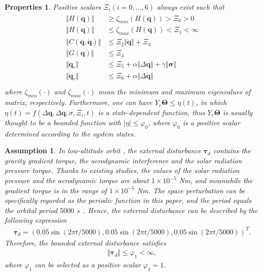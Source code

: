 \documentclass[3p]{elsarticle}
\theoremstyle{plain}
\newtheorem{myas}{Assumption}
\newtheorem{mypro}{Properties}
\theoremstyle{remark}
\begin{document}
\begin{mypro}\cite{parra2003dynamic}\label{pro:1}
Positive scalars $\Xi_i(i = 0,\ldots,6)$ always exist such that
\begin{align}
\begin{split}
\Vert H(\bm q)\Vert & \ge \zeta_{min}(H(\bm q))>\Xi_0>0\\
\Vert H(\bm q)\Vert & \le \zeta_{max}(H(\bm q))<\Xi_1<\infty\\
\Vert C(\bm q,\dot {\bm q})\Vert & \le \Xi_2\Vert\dot {\bm q}\Vert+\Xi_3\\
\Vert G(\bm q)\Vert & \le \Xi_4\\
\Vert \dot {\bm q}_r\Vert & \le \Xi_5+\alpha\Vert\Delta \bm q\Vert+\gamma\Vert\bm\sigma\Vert\\
\Vert \ddot {\bm q}_r\Vert & \le \Xi_6+\alpha\Vert\Delta \dot {\bm q}\Vert\\
\end{split}
\end{align}
where $\zeta_{min}(\cdot)$ and $\zeta_{max}(\cdot)$ mean the minimum and maximum eigenvalues of matrix, respectively. Furthermore, one can have $Y_r\bm\Theta\le \eta(t)$, in which $\eta(t)=f(\Delta \bm q,\Delta \dot {\bm q},\sigma,\Xi_i,t)$ is a state-dependent function, thus $Y_r\bm\Theta$ is usually thought to be a bounded function with $\vert\eta\vert\le\varphi_0$, where $\varphi_0$ is a positive scalar determined according to the system states.
\end{mypro}

\begin{myas}
In low-altitude orbit , the external disturbance $\bm\tau_d$ contains the gravity gradient torque, the aerodynamic interference and the solar radiation pressure torque. Thanks to existing studies, the values of the solar radiation pressure and the aerodynamic torque are about $1\times10^{-5}$ Nm, and meanwhile the gradient torque is in the range of $1\times10^{-5}$ Nm. The space perturbation can be specifically regarded as the periodic function in this paper, and the period equals the orbital period $5000$ s~\cite{Inamori2015192}. Hence, the external disturbance can be described by the following expression
\begin{align}
\bm\tau_d=\left(0.05\sin(2\pi t/5000),0.05\sin(2\pi t/5000),0.05\sin(2\pi t/5000)\right)^T.
\end{align}
Therefore, the bounded external disturbance satisfies
\begin{align}
\Vert\bm\tau_d\Vert\le\varphi_1<\infty,
\end{align}
where $\varphi_1$ can be selected as a positive scalar $\varphi_1=1$.
\end{myas}
\end{document}
